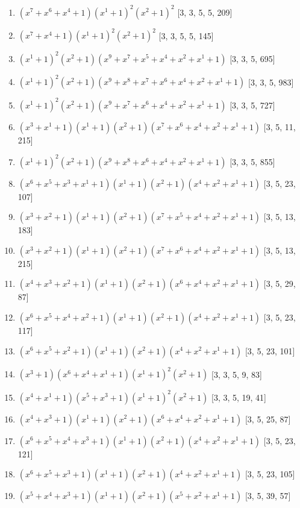 \documentclass[10pt,twocolumn]{article}
\begin{document}
\begin{enumerate}
\item $(x^{7} + x^{6} + x^{4} + 1)(x^{1} + 1)^{2}(x^{2} + 1)^{2}$  [3, 3, 5, 5, 209]
\item $(x^{7} + x^{4} + 1)(x^{1} + 1)^{2}(x^{2} + 1)^{2}$  [3, 3, 5, 5, 145]
\item $(x^{1} + 1)^{2}(x^{2} + 1)(x^{9} + x^{7} + x^{5} + x^{4} + x^{2} + x^{1} + 1)$  [3, 3, 5, 695]
\item $(x^{1} + 1)^{2}(x^{2} + 1)(x^{9} + x^{8} + x^{7} + x^{6} + x^{4} + x^{2} + x^{1} + 1)$  [3, 3, 5, 983]
\item $(x^{1} + 1)^{2}(x^{2} + 1)(x^{9} + x^{7} + x^{6} + x^{4} + x^{2} + x^{1} + 1)$  [3, 3, 5, 727]
\item $(x^{3} + x^{1} + 1)(x^{1} + 1)(x^{2} + 1)(x^{7} + x^{6} + x^{4} + x^{2} + x^{1} + 1)$  [3, 5, 11, 215]
\item $(x^{1} + 1)^{2}(x^{2} + 1)(x^{9} + x^{8} + x^{6} + x^{4} + x^{2} + x^{1} + 1)$  [3, 3, 5, 855]
\item $(x^{6} + x^{5} + x^{3} + x^{1} + 1)(x^{1} + 1)(x^{2} + 1)(x^{4} + x^{2} + x^{1} + 1)$  [3, 5, 23, 107]
\item $(x^{3} + x^{2} + 1)(x^{1} + 1)(x^{2} + 1)(x^{7} + x^{5} + x^{4} + x^{2} + x^{1} + 1)$  [3, 5, 13, 183]
\item $(x^{3} + x^{2} + 1)(x^{1} + 1)(x^{2} + 1)(x^{7} + x^{6} + x^{4} + x^{2} + x^{1} + 1)$  [3, 5, 13, 215]
\item $(x^{4} + x^{3} + x^{2} + 1)(x^{1} + 1)(x^{2} + 1)(x^{6} + x^{4} + x^{2} + x^{1} + 1)$  [3, 5, 29, 87]
\item $(x^{6} + x^{5} + x^{4} + x^{2} + 1)(x^{1} + 1)(x^{2} + 1)(x^{4} + x^{2} + x^{1} + 1)$  [3, 5, 23, 117]
\item $(x^{6} + x^{5} + x^{2} + 1)(x^{1} + 1)(x^{2} + 1)(x^{4} + x^{2} + x^{1} + 1)$  [3, 5, 23, 101]
\item $(x^{3} + 1)(x^{6} + x^{4} + x^{1} + 1)(x^{1} + 1)^{2}(x^{2} + 1)$  [3, 3, 5, 9, 83]
\item $(x^{4} + x^{1} + 1)(x^{5} + x^{3} + 1)(x^{1} + 1)^{2}(x^{2} + 1)$  [3, 3, 5, 19, 41]
\item $(x^{4} + x^{3} + 1)(x^{1} + 1)(x^{2} + 1)(x^{6} + x^{4} + x^{2} + x^{1} + 1)$  [3, 5, 25, 87]
\item $(x^{6} + x^{5} + x^{4} + x^{3} + 1)(x^{1} + 1)(x^{2} + 1)(x^{4} + x^{2} + x^{1} + 1)$  [3, 5, 23, 121]
\item $(x^{6} + x^{5} + x^{3} + 1)(x^{1} + 1)(x^{2} + 1)(x^{4} + x^{2} + x^{1} + 1)$  [3, 5, 23, 105]
\item $(x^{5} + x^{4} + x^{3} + 1)(x^{1} + 1)(x^{2} + 1)(x^{5} + x^{2} + x^{1} + 1)$  [3, 5, 39, 57]

\end{enumerate}
\end{document}
